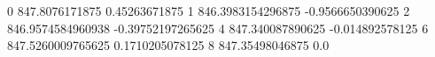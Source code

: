 0 847.8076171875 0.45263671875
1 846.3983154296875 -0.9566650390625
2 846.9574584960938 -0.39752197265625
4 847.340087890625 -0.014892578125
6 847.5260009765625 0.1710205078125
8 847.35498046875 0.0
